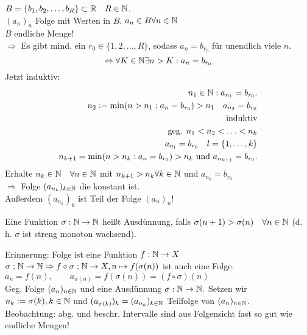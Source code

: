 \begin{bsp}
	\(B= \{b_1, b_2,\ldots,b_R \} \subset \mathbb{R} \quad R\in\mathbb{N} \).\\
	\( (a_n)_n \) Folge mit Werten in \(B\).
	\(a_n \in B \forall n\in\mathbb{N} \)\\
	\(B\) endliche Menge!\\
	\( \Rightarrow \) Es gibt mind. ein \(r_0 \in \{1,2,\ldots,R\} \), sodass \( a_n=b_{r_0}  \) für unendlich viele \(n\).\\
	\[ \Leftrightarrow \forall K\in\mathbb{N} \exists n>K : a_n = b_{r_0} \]
	Jetzt induktiv: \\
	\begin{align*}
		n_1 \in\mathbb{N}: a_{n_1} = b_{r_0}.\\
		n_2 := \min (n>n_1:a_n=b_{r_0}) >n_1 \quad a_{n_2} = b_{r_0}\\
		\text{induktiv}\\
		\text{geg. } n_1 < n_2<\ldots<n_k\\
		a_{n_l} = b_{r_0} \quad l = \{1, \ldots,k \}\\
		n_{k+1} = \min(n>n_k:a_n = b_{r_0}) > n_k \text{ und } a_{n_{k+1}} = b_{r_0}.
	\end{align*}
	Erhalte \(n_k\in\mathbb{N} \quad \forall n\in\mathbb{N} \) mit \( n_{k+1} > n_k \forall k\in\mathbb{N} \) und \( a_{n_k} = b_{r_0} \)\\
	\( \Rightarrow \) Folge \( (a_{n_k})_{k\in\mathbb{N}} \) die konstant ist.\\
	Außerdem \( (a_{n_k})_k \) ist Teil der Folge \( (a_n)_n \)!
\end{bsp}
\begin{defi}[Teilfolge]
	Eine Funktion \( \sigma:\mathbb{N} \rightarrow\mathbb{N} \) heißt Ausdünnung, falls \( \sigma (n+1) > \sigma(n) \quad \forall n\in\mathbb{N} \) (d. h. \(\sigma\) ist streng monoton wachsend).
\end{defi}
Erinnerung: Folge ist eine Funktion \(f: \mathbb{N}\rightarrow X \)\\
\( \sigma : \mathbb{N}\rightarrow\mathbb{N} \Rightarrow f \circ \sigma : \mathbb{N}\rightarrow X, n\mapsto f(\sigma(n))  \) ist auch eine Folge.\\
\(a_n = f(n),\qquad a_{\sigma(n)} = f(\sigma(n)) = (f\circ\sigma)(n) \)\\
Geg. Folge \( (a_n)_{n\in\mathbb{N}} \) und eine Ausdünnung \( \sigma : \mathbb{N}\rightarrow \mathbb{N}. \) Setzen wir \( n_k := \sigma (k), k\in\mathbb{N} \) und \( (a_{\sigma(k)})_k = (a_{n_k})_{k\in\mathbb{N}} \) Teilfolge von \( (a_n)_{n\in\mathbb{N}} \).\\
Beobachtung: abg. und beschr. Intervalle sind aus Folgensicht fast so gut wie endliche Mengen!
